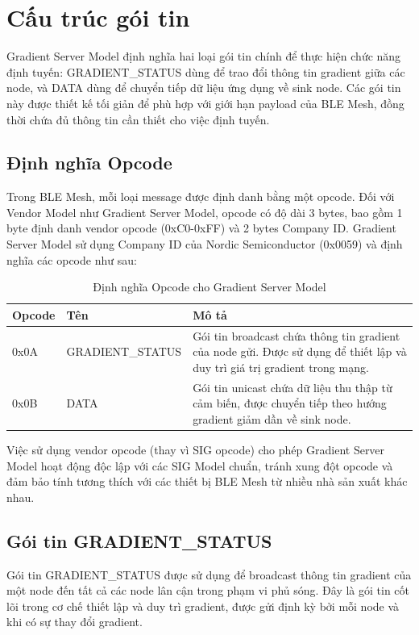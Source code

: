 \section{Cấu trúc gói tin}

Gradient Server Model định nghĩa hai loại gói tin chính để thực hiện chức năng định tuyến: GRADIENT\_STATUS dùng để trao đổi thông tin gradient giữa các node, và DATA dùng để chuyển tiếp dữ liệu ứng dụng về sink node. Các gói tin này được thiết kế tối giản để phù hợp với giới hạn payload của BLE Mesh, đồng thời chứa đủ thông tin cần thiết cho việc định tuyến.

\subsection{Định nghĩa Opcode}

Trong BLE Mesh, mỗi loại message được định danh bằng một opcode. Đối với Vendor Model như Gradient Server Model, opcode có độ dài 3 bytes, bao gồm 1 byte định danh vendor opcode (0xC0-0xFF) và 2 bytes Company ID. Gradient Server Model sử dụng Company ID của Nordic Semiconductor (0x0059) và định nghĩa các opcode như sau:

\begin{table}[h!]
\centering
\caption{Định nghĩa Opcode cho Gradient Server Model}
\label{tab:gradient_opcodes}
\begin{tabular}{|l|l|p{8cm}|}
\hline
\textbf{Opcode} & \textbf{Tên} & \textbf{Mô tả} \\
\hline
0x0A & GRADIENT\_STATUS & Gói tin broadcast chứa thông tin gradient của node gửi. Được sử dụng để thiết lập và duy trì giá trị gradient trong mạng. \\
\hline
0x0B & DATA & Gói tin unicast chứa dữ liệu thu thập từ cảm biến, được chuyển tiếp theo hướng gradient giảm dần về sink node. \\
\hline
\end{tabular}
\end{table}

Việc sử dụng vendor opcode (thay vì SIG opcode) cho phép Gradient Server Model hoạt động độc lập với các SIG Model chuẩn, tránh xung đột opcode và đảm bảo tính tương thích với các thiết bị BLE Mesh từ nhiều nhà sản xuất khác nhau.

\subsection{Gói tin GRADIENT\_STATUS}

Gói tin GRADIENT\_STATUS được sử dụng để broadcast thông tin gradient của một node đến tất cả các node lân cận trong phạm vi phủ sóng. Đây là gói tin cốt lõi trong cơ chế thiết lập và duy trì gradient, được gửi định kỳ bởi mỗi node và khi có sự thay đổi gradient.

